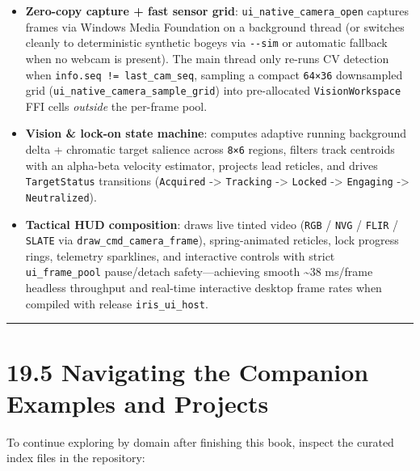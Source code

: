 \documentclass[
  english,
  oneside]{book}
\providecommand{\tightlist}{%
  \setlength{\itemsep}{0pt}\setlength{\parskip}{0pt}}
\begin{document}
\begin{itemize}
\tightlist
\item
  \textbf{Zero-copy capture + fast sensor grid}:
  \texttt{ui\_native\_camera\_open} captures frames via Windows Media
  Foundation on a background thread (or switches cleanly to
  deterministic synthetic bogeys via \texttt{-\/-sim} or automatic
  fallback when no webcam is present). The main thread only re-runs CV
  detection when \texttt{info.seq\ !=\ last\_cam\_seq}, sampling a
  compact \texttt{64×36} downsampled grid
  (\texttt{ui\_native\_camera\_sample\_grid}) into pre-allocated
  \texttt{VisionWorkspace} FFI cells \emph{outside} the per-frame pool.
\item
  \textbf{Vision \& lock-on state machine}: computes adaptive running
  background delta + chromatic target salience across \texttt{8×6}
  regions, filters track centroids with an alpha-beta velocity
  estimator, projects lead reticles, and drives \texttt{TargetStatus}
  transitions (\texttt{Acquired} -\textgreater{} \texttt{Tracking}
  -\textgreater{} \texttt{Locked} -\textgreater{} \texttt{Engaging}
  -\textgreater{} \texttt{Neutralized}).
\item
  \textbf{Tactical HUD composition}: draws live tinted video
  (\texttt{RGB} / \texttt{NVG} / \texttt{FLIR} / \texttt{SLATE} via
  \texttt{draw\_cmd\_camera\_frame}), spring-animated reticles, lock
  progress rings, telemetry sparklines, and interactive controls with
  strict \texttt{ui\_frame\_pool} pause/detach safety---achieving smooth
  \textasciitilde38 ms/frame headless throughput and real-time
  interactive desktop frame rates when compiled with release
  \texttt{iris\_ui\_host}.
\end{itemize}

\begin{center}\rule{0.5\linewidth}{0.5pt}\end{center}

\section{19.5 Navigating the Companion Examples and
Projects}\label{navigating-the-companion-examples-and-projects}

To continue exploring by domain after finishing this book, inspect the
curated index files in the repository:
\end{document}
